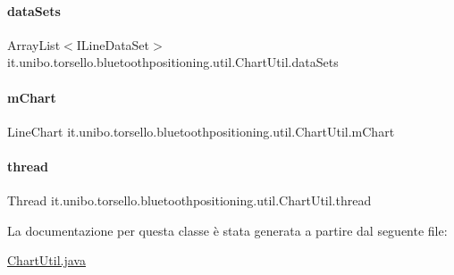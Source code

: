 \paragraph{\texorpdfstring{data\+Sets}{dataSets}}
{\footnotesize\ttfamily Array\+List$<$I\+Line\+Data\+Set$>$ it.\+unibo.\+torsello.\+bluetoothpositioning.\+util.\+Chart\+Util.\+data\+Sets\hspace{0.3cm}{\ttfamily [private]}}

\hypertarget{classit_1_1unibo_1_1torsello_1_1bluetoothpositioning_1_1util_1_1ChartUtil_a60b5bd6796cc5dcde12d9a6bb3e67c86_a60b5bd6796cc5dcde12d9a6bb3e67c86}{}\label{classit_1_1unibo_1_1torsello_1_1bluetoothpositioning_1_1util_1_1ChartUtil_a60b5bd6796cc5dcde12d9a6bb3e67c86_a60b5bd6796cc5dcde12d9a6bb3e67c86} 
\paragraph{\texorpdfstring{m\+Chart}{mChart}}
{\footnotesize\ttfamily Line\+Chart it.\+unibo.\+torsello.\+bluetoothpositioning.\+util.\+Chart\+Util.\+m\+Chart\hspace{0.3cm}{\ttfamily [private]}}

\hypertarget{classit_1_1unibo_1_1torsello_1_1bluetoothpositioning_1_1util_1_1ChartUtil_ac73af861c9ca49e226fe1218cef6c572_ac73af861c9ca49e226fe1218cef6c572}{}\label{classit_1_1unibo_1_1torsello_1_1bluetoothpositioning_1_1util_1_1ChartUtil_ac73af861c9ca49e226fe1218cef6c572_ac73af861c9ca49e226fe1218cef6c572} 
\paragraph{\texorpdfstring{thread}{thread}}
{\footnotesize\ttfamily Thread it.\+unibo.\+torsello.\+bluetoothpositioning.\+util.\+Chart\+Util.\+thread\hspace{0.3cm}{\ttfamily [private]}}



La documentazione per questa classe è stata generata a partire dal seguente file\+:\begin{DoxyCompactItemize}
\item 
\hyperlink{ChartUtil_8java}{Chart\+Util.\+java}\end{DoxyCompactItemize}
